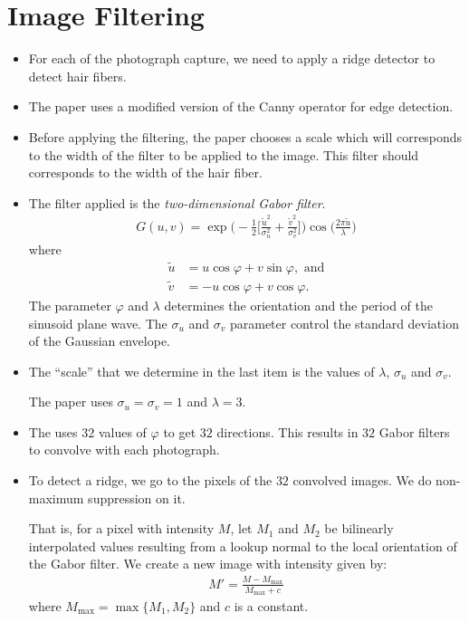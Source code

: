 \documentclass[10pt]{article}
\begin{document}
	\section{Image Filtering} %
	\label{sec:image_filtering}
	
	\begin{itemize}
		\item For each of the photograph capture, we need to apply a ridge detector to detect hair fibers.

		\item The paper uses a modified version of the Canny operator for edge detection.

		\item Before applying the filtering, the paper chooses a scale which will corresponds to the width of the filter to be applied to the image. This filter should corresponds to the width of the hair fiber.
		
		\item The filter applied is the \emph{two-dimensional Gabor filter}.
		\begin{align*}
		  G(u,v) = \exp\bigg( -\frac{1}{2} \bigg[ \frac{\tilde{u}^2}{\sigma_u^2} + \frac{\tilde{v}^2}{\sigma_v^2} \bigg] \bigg) \cos\bigg( \frac{2\pi\tilde{u}}{\lambda} \bigg)
		\end{align*}
		where
		\begin{align*}
		  \tilde{u} &= u \cos \varphi + v \sin \varphi, \mbox{ and}\\
		  \tilde{v} &= -u \cos \varphi + v \cos \varphi.
		\end{align*}
		The parameter $\varphi$ and $\lambda$ determines the orientation and the period of the sinusoid plane wave. The $\sigma_u$ and $\sigma_v$ parameter control the standard deviation of the Gaussian envelope.
		
		\item The ``scale'' that we determine in the last item is the values of $\lambda$, $\sigma_u$ and $\sigma_v$.
		
		The paper uses $\sigma_u = \sigma_v = 1$ and $\lambda = 3$.
		
		\item The uses $32$ values of $\varphi$ to get $32$ directions. This results in $32$ Gabor filters to convolve with each photograph.
		
		\item To detect a ridge, we go to the pixels of the $32$ convolved images. We do non-maximum suppression on it.
		
		That is, for a pixel with intensity $M$, let $M_1$ and $M_2$ be bilinearly interpolated values resulting from a lookup normal to the local orientation of the Gabor filter. We create a new image with intensity given by:
		\begin{align*}
		  M' = \frac{M - M_{\max}}{M_{\max}+c}
		\end{align*}
		where $M_{\max} = \max\{ M_1, M_2 \}$ and $c$ is a constant.
		

\end{itemize}
\end{document}

